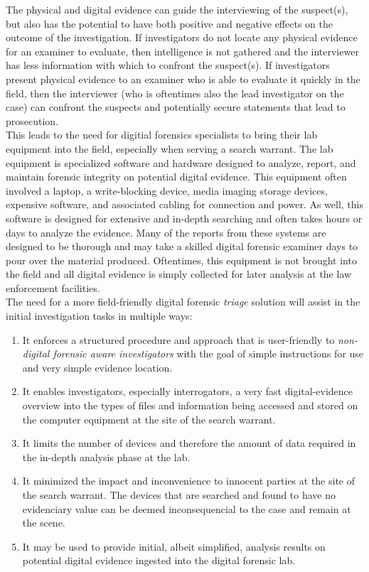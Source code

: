 \documentclass[12pt]{article}
\begin{document}
The physical and digital evidence can guide the interviewing of the suspect(s), but also
has the potential to have both positive and negative effects on the
outcome of the investigation. If investigators do not locate any physical evidence for an examiner
to evaluate, then intelligence is not gathered and the interviewer has less information with which
to confront the suspect(s). If investigators present physical evidence to an examiner who is able to
evaluate it quickly in the field, then the interviewer (who is oftentimes also the lead investigator
on the case) can confront the suspects and potentially secure statements that lead to prosecution.\\

This leads to the need for digitial forensics specialists to bring their lab equipment into the field,
especially when serving a search warrant.  The lab equipment is specialized software and hardware
designed to analyze, report, and maintain forensic integrity on potential digital evidence.  This
equipment often involved a laptop, a write-blocking device, media imaging storage devices, expensive
software, and associated cabling for connection and power.  As well, this software is designed for
extensive and in-depth searching and often takes hours or days to analyze the evidence.  Many of the
reports from these systems are designed to be thorough and may take a skilled digital forensic
examiner days to pour over the material produced.  Oftentimes, this equipment is not brought
into the field and all digital evidence is simply collected for later analysis at the law
enforcement facilities.\\

The need for a more field-friendly digital forensic {\em triage} solution will assist in the initial
investigation tasks in multiple ways:
\begin{enumerate}
  \item It enforces a structured procedure and approach that is user-friendly to {\em non-digital
  forensic aware investigators} with the goal of simple instructions for use and very simple 
  evidence location.
  \item It enables investigators, especially interrogators, a very fast digital-evidence overview
  into the types of files
  and information being accessed and stored on the computer equipment at the site of the search
  warrant.
  \item It limits the number of devices and therefore the amount of data required in the in-depth
  analysis phase at the lab.
  \item It minimized the impact and inconvenience to innocent parties at the site of the 
  search warrant.  The devices that are searched and found to have no evidenciary value can be
  deemed inconsequencial to the case and remain at the scene.
  \item It may be used to provide initial, albeit simplified, analysis results on potential
  digital evidence ingested into the digital forensic lab.
\end{enumerate}
\end{document}
